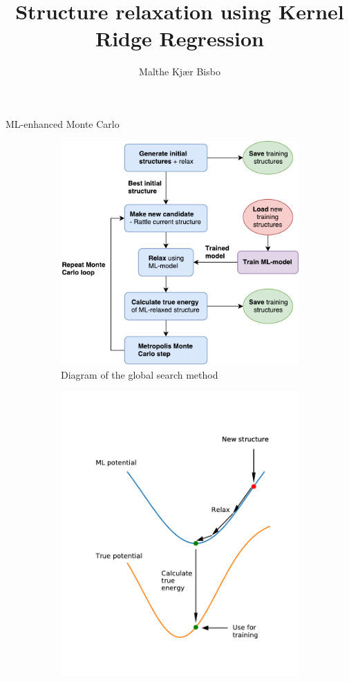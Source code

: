 \documentclass{beamer}
\title{Structure relaxation using Kernel Ridge Regression}
\author{Malthe Kj\ae r Bisbo}
\begin{document}
\begin{frame}
	\titlepage
\end{frame}

\begin{frame}{ML-enhanced Monte Carlo}
\begin{figure}
	\centering
	\begin{subfigure}{0.5\textwidth}
		\centering
		\includegraphics[width=\linewidth]{GlobalSearchModel}
		\caption*{Diagram of the global search method}
	\end{subfigure}%
	\begin{subfigure}{0.5\textwidth}
		\centering
		\includegraphics[width=\linewidth]{MLrelaxFigure}

\end{subfigure}
\end{figure}
\end{frame}
\end{document}
